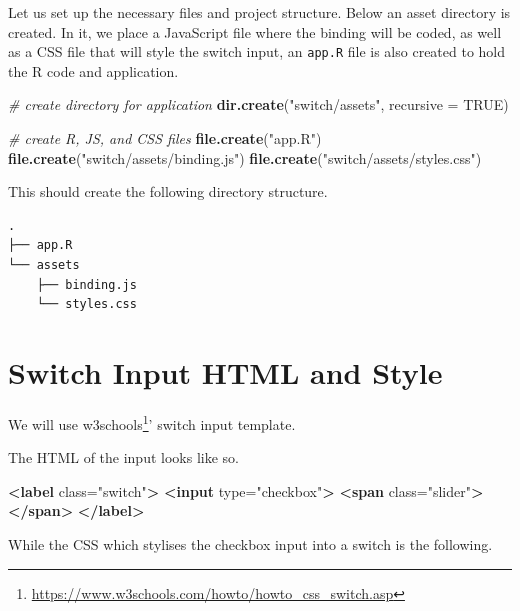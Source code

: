 \documentclass[10pt,]{krantz}
\makeatletter
\newenvironment{Shaded}{\begin{snugshade}}{\end{snugshade}}
\newcommand{\CommentTok}[1]{\textcolor[rgb]{0.37,0.37,0.37}{\textit{#1}}}
\newcommand{\DataTypeTok}[1]{\textcolor[rgb]{0.27,0.27,0.27}{#1}}
\newcommand{\KeywordTok}[1]{\textcolor[rgb]{0.27,0.27,0.27}{\textbf{#1}}}
\newcommand{\NormalTok}[1]{#1}
\newcommand{\OtherTok}[1]{\textcolor[rgb]{0.37,0.37,0.37}{#1}}
\newcommand{\StringTok}[1]{\textcolor[rgb]{0.5,0.5,0.5}{#1}}
\renewcommand{\href}[2]{#2\footnote{\url{#1}}}
\newenvironment{kframe}{%
\medskip{}
\setlength{\fboxsep}{.8em}
 \def\at@end@of@kframe{}%
 \ifinner\ifhmode%
  \def\at@end@of@kframe{\end{minipage}}%
  \begin{minipage}{\columnwidth}%
 \fi\fi%
 \def\FrameCommand##1{\hskip\@totalleftmargin \hskip-\fboxsep
 \colorbox{shadecolor}{##1}\hskip-\fboxsep
     \hskip-\linewidth \hskip-\@totalleftmargin \hskip\columnwidth}%
 \MakeFramed {\advance\hsize-\width
   \@totalleftmargin\z@ \linewidth\hsize
   \@setminipage}}%
 {\par\unskip\endMakeFramed%
 \at@end@of@kframe}
\renewenvironment{Shaded}{\begin{kframe}}{\end{kframe}}
\makeatother
\begin{document}
Let us set up the necessary files and project structure. Below an asset directory is created. In it, we place a JavaScript file where the binding will be coded, as well as a CSS file that will style the switch input, an \texttt{app.R} file is also created to hold the R code and application.

\begin{Shaded}
\begin{Highlighting}[]
\CommentTok{# create directory for application}
\KeywordTok{dir.create}\NormalTok{(}\StringTok{"switch/assets"}\NormalTok{, }\DataTypeTok{recursive =} \OtherTok{TRUE}\NormalTok{)}

\CommentTok{# create R, JS, and CSS files}
\KeywordTok{file.create}\NormalTok{(}\StringTok{"app.R"}\NormalTok{)}
\KeywordTok{file.create}\NormalTok{(}\StringTok{"switch/assets/binding.js"}\NormalTok{)}
\KeywordTok{file.create}\NormalTok{(}\StringTok{"switch/assets/styles.css"}\NormalTok{)}
\end{Highlighting}
\end{Shaded}

This should create the following directory structure.

\begin{verbatim}
.
├── app.R
└── assets
    ├── binding.js
    └── styles.css
\end{verbatim}

\hypertarget{shiny-input-intro}{%
\section{Switch Input HTML and Style}\label{shiny-input-intro}}

We will use \href{https://www.w3schools.com/howto/howto_css_switch.asp}{w3schools}' switch input template.

The HTML of the input looks like so.

\begin{Shaded}
\begin{Highlighting}[]
\KeywordTok{<label}\OtherTok{ class=}\StringTok{"switch"}\KeywordTok{>}
  \KeywordTok{<input}\OtherTok{ type=}\StringTok{"checkbox"}\KeywordTok{>}
  \KeywordTok{<span}\OtherTok{ class=}\StringTok{"slider"}\KeywordTok{></span>}
\KeywordTok{</label>}
\end{Highlighting}
\end{Shaded}

While the CSS which stylises the checkbox input into a switch is the following.
\end{document}
